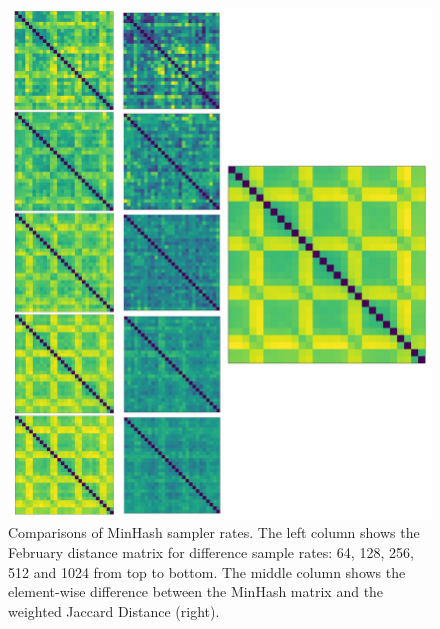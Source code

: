 \documentclass[../main.tex]{subfiles}
\begin{document}
\begin{figure}[ht]
\vspace{-40mm}
\centering
\begin{adjustbox}{center}
\includegraphics[width=1.4\textwidth]{graphics/results/comparison_minhash.png}
\end{adjustbox}
\caption{Comparisons of MinHash sampler rates. The left column shows the February distance matrix for difference sample rates: 64, 128, 256, 512 and 1024 from top to bottom. The middle column shows the element-wise difference between the MinHash matrix and the weighted Jaccard Distance (right).}
\label{fig:comparison_minhash}
\end{figure}
\end{document}
